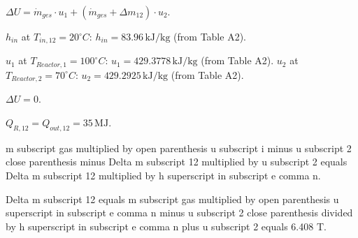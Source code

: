 \( \Delta U = \dot{m}_{ges} \cdot u_1 + (\dot{m}_{ges} + \Delta m_{12}) \cdot u_2 \).  

\( h_{in} \) at \( T_{in,12} = 20^\circ C \): \( h_{in} = 83.96 \, \text{kJ/kg} \) (from Table A2).  

\( u_1 \) at \( T_{Reactor,1} = 100^\circ C \): \( u_1 = 429.3778 \, \text{kJ/kg} \) (from Table A2).  
\( u_2 \) at \( T_{Reactor,2} = 70^\circ C \): \( u_2 = 429.2925 \, \text{kJ/kg} \) (from Table A2).  

\( \Delta U = 0 \).  

\( Q_{R,12} = Q_{out,12} = 35 \, \text{MJ} \).

m subscript gas multiplied by open parenthesis u subscript i minus u subscript 2 close parenthesis minus Delta m subscript 12 multiplied by u subscript 2 equals Delta m subscript 12 multiplied by h superscript in subscript e comma n.  

Delta m subscript 12 equals m subscript gas multiplied by open parenthesis u superscript in subscript e comma n minus u subscript 2 close parenthesis divided by h superscript in subscript e comma n plus u subscript 2 equals 6.408 T.